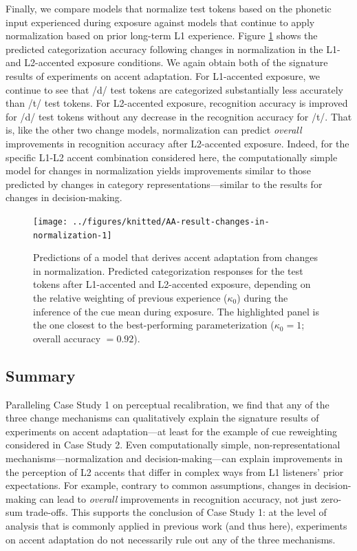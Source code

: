 \documentclass[
  11pt,
  man,floatsintext]{apa6}
\begin{document}
Finally, we compare models that normalize test tokens based on the phonetic input experienced during exposure against models that continue to apply normalization based on prior long-term L1 experience. Figure \ref{fig:AA-result-changes-in-normalization} shows the predicted categorization accuracy following changes in normalization in the L1- and L2-accented exposure conditions. We again obtain both of the signature results of experiments on accent adaptation. For L1-accented exposure, we continue to see that /d/ test tokens are categorized substantially less accurately than /t/ test tokens. For L2-accented exposure, recognition accuracy is improved for /d/ test tokens without any decrease in the recognition accuracy for /t/. That is, like the other two change models, normalization can predict \emph{overall} improvements in recognition accuracy after L2-accented exposure. Indeed, for the specific L1-L2 accent combination considered here, the computationally simple model for changes in normalization yields improvements similar to those predicted by changes in category representations---similar to the results for changes in decision-making.



\begin{figure}

{\centering \texttt{[image: ../figures/knitted/AA-result-changes-in-normalization-1]} 

}

\caption{Predictions of a model that derives accent adaptation from changes in normalization. Predicted categorization responses for the test tokens after L1-accented and L2-accented exposure, depending on the relative weighting of previous experience (\(\kappa_0\)) during the inference of the cue mean during exposure. The highlighted panel is the one closest to the best-performing parameterization (\(\kappa_0 = 1\); overall accuracy \(=0.92\)).}\label{fig:AA-result-changes-in-normalization}
\end{figure}

\hypertarget{summary-1}{%
\subsection{Summary}\label{summary-1}}

Paralleling Case Study 1 on perceptual recalibration, we find that any of the three change mechanisms can qualitatively explain the signature results of experiments on accent adaptation---at least for the example of cue reweighting considered in Case Study 2. Even computationally simple, non-representational mechanisms---normalization and decision-making---can explain improvements in the perception of L2 accents that differ in complex ways from L1 listeners' prior expectations. For example, contrary to common assumptions, changes in decision-making can lead to \emph{overall} improvements in recognition accuracy, not just zero-sum trade-offs. This supports the conclusion of Case Study 1: at the level of analysis that is commonly applied in previous work (and thus here), experiments on accent adaptation do not necessarily rule out any of the three mechanisms.
\end{document}
